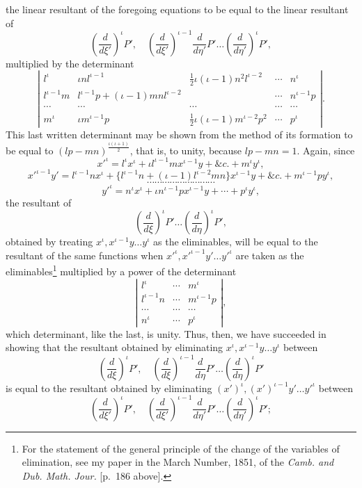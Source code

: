 \documentclass[11pt]{article}
\newcommand{\sourcepage}[1]{\marginpar{\scriptsize p.~#1}}
\begin{document}
{{\sourcepage{275}
the linear resultant of the foregoing equations to be equal to the linear resultant of
\[
\left(\frac{d}{d\xi'}\right)^\iota P',\quad
\left(\frac{d}{d\xi'}\right)^{\iota-1}\frac{d}{d\eta'}P'\ldots
\left(\frac{d}{d\eta'}\right)^\iota P',
\]
multiplied by the determinant
\[
\left|\begin{array}{ccccc}
l^\iota&\iota nl^{\iota-1}&\frac12\iota(\iota-1)n^2l^{\iota-2}&\cdots&n^\iota\\
l^{\iota-1}m&l^{\iota-1}p+(\iota-1)mnl^{\iota-2}& &\cdots&n^{\iota-1}p\\
\cdots&\cdots&\cdots&\cdots&\cdots\\
m^\iota&\iota m^{\iota-1}p&\frac12\iota(\iota-1)m^{\iota-2}p^2&\cdots&p^\iota
\end{array}\right|.
\]
This last written determinant may be shown from the method of its formation to be equal to $(lp-mn)^{\frac{\iota(\iota+1)}2}$, that is, to unity, because $lp-mn=1$. Again, since
\[
x'^\iota=l^\iota x^\iota+\iota l^{\iota-1}mx^{\iota-1}y+\&c.+m^\iota y^\iota,
\]
\[
x'^{\iota-1}y'=l^{\iota-1}nx^\iota+\{l^{\iota-1}n+(\iota-1)l^{\iota-2}mn\}x^{\iota-1}y+\&c.+m^{\iota-1}py^\iota,
\]
\[
\cdots\cdots\cdots\cdots\cdots\cdots\cdots\cdots\cdots
\]
\[
y'^\iota=n^\iota x^\iota+\iota n^{\iota-1}px^{\iota-1}y+\cdots+p^\iota y^\iota,
\]
the resultant of
\[
\left(\frac{d}{d\xi}\right)^\iota P'\ldots
\left(\frac{d}{d\eta}\right)^\iota P',
\]
obtained by treating $x^\iota,x^{\iota-1}y\ldots y^\iota$ as the eliminables, will be equal to the resultant of the same functions when $x'^\iota,x'^{\iota-1}y'\ldots y'^\iota$ are taken as the eliminables\footnote{For the statement of the general principle of the change of the variables of elimination, see my paper in the March Number, 1851, of the \emph{Camb. and Dub. Math. Jour.} [p.~186 above].} multiplied by a power of the determinant
\[
\left|\begin{array}{cccc}
l^\iota&\cdots&m^\iota\\
l^{\iota-1}n&\cdots&m^{\iota-1}p\\
\cdots&\cdots&\cdots\\
n^\iota&\cdots&p^\iota
\end{array}\right|,
\]
which determinant, like the last, is unity. Thus, then, we have succeeded in showing that the resultant obtained by eliminating $x^\iota,x^{\iota-1}y\ldots y^\iota$ between
\[
\left(\frac{d}{d\xi}\right)^\iota P',\quad
\left(\frac{d}{d\xi}\right)^{\iota-1}\frac{d}{d\eta}P'\ldots
\left(\frac{d}{d\eta}\right)^\iota P'
\]
is equal to the resultant obtained by eliminating $(x')^\iota,(x')^{\iota-1}y'\ldots y'^\iota$ between
\[
\left(\frac{d}{d\xi'}\right)^\iota P',\quad
\left(\frac{d}{d\xi'}\right)^{\iota-1}\frac{d}{d\eta'}P'\ldots
\left(\frac{d}{d\eta'}\right)^\iota P';
\]

}}
\end{document}
